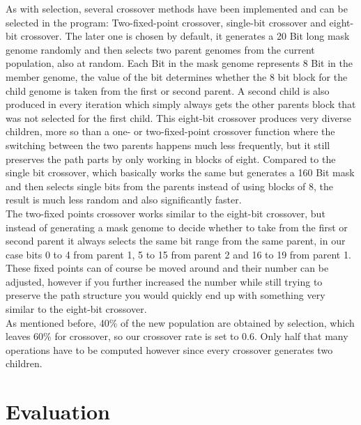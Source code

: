 As with selection, several crossover methods have been implemented and can be selected in the program: Two-fixed-point crossover, single-bit crossover and eight-bit crossover. The later one is chosen by default, it generates a 20 Bit long mask genome randomly and then selects two parent genomes from the current population, also at random. Each Bit in the mask genome represents 8 Bit in the member genome, the value of the bit determines whether the 8 bit block for the child genome is taken from the first or second parent. A second child is also produced in every iteration which simply always gets the other parents block that was not selected for the first child. This eight-bit crossover produces very diverse children, more so than a one- or two-fixed-point crossover function where the switching between the two parents happens much less frequently, but it still preserves the path parts by only working in blocks of eight. Compared to the single bit crossover, which basically works the same but generates a 160 Bit mask and then selects single bits from the parents instead of using blocks of 8, the result is much less random and also significantly faster.\\
The two-fixed points crossover works similar to the eight-bit crossover, but instead of generating a mask genome to decide whether to take from the first or second parent it always selects the same bit range from the same parent, in our case bits 0 to 4 from parent 1, 5 to 15 from parent 2 and 16 to 19 from parent 1. These fixed points can of course be moved around and their number can be adjusted, however if you further increased the number while still trying to preserve the path structure you would quickly end up with something very similar to the eight-bit crossover.\\
As mentioned before, 40\% of the new population are obtained by selection, which leaves 60\% for crossover, so our crossover rate is set to 0.6. Only half that many operations have to be computed however since every crossover generates two children.

\section{Evaluation} %
\label{sec:imp_evaluation}

